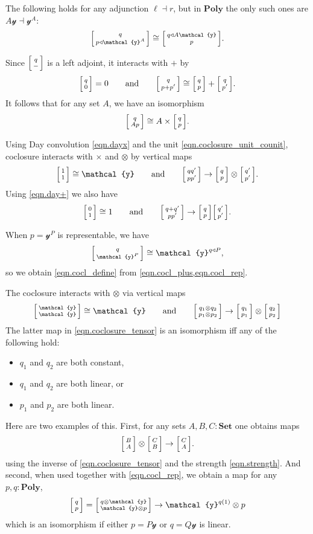 \documentclass[11pt, one side, article]{memoir}
\makeatletter
\theoremstyle{definition}
\theoremstyle{plain}
\newcommand{\Cat}[1]{\mathbf{#1}}%
\newcommand{\tn}[1]{\textnormal{#1}}
\newcommand{\smset}{\Cat{Set}}
\newcommand{\yon}{{\mathcal{y}}}
\newcommand{\poly}{\Cat{Poly}}
\newcommand{\0}{\textsf{0}}
\newcommand{\1}{\tn{\textsf{1}}}
\newcommand{\tri}{\mathbin{\triangleleft}}
\newcommand{\biglens}[2]{
     \begin{bmatrix}{\vphantom{f_f^f}#2} \\ {\vphantom{f_f^f}#1} \end{bmatrix}
}
\newcommand{\littlelens}[2]{
     \begin{bsmallmatrix}{\vphantom{f}#2} \\ {\vphantom{f}#1} \end{bsmallmatrix}
}
\newcommand{\lens}[2]{
  \relax\if@display
     \biglens{#1}{#2}
  \else
     \littlelens{#1}{#2}
  \fi
}
\newcommand{\hh}[2][]{#1 \tn{#2} #1}
\newcommand{\qqand}{\hh[\qquad]{and}}
\makeatother
\begin{document}
The following holds for any adjunction $\ell\dashv r$, but in $\poly$ the only such ones are $A\yon\dashv\yon^A$:
\begin{equation}
\lens{p\tri\yon^A}{q}\cong\lens{p}{q\tri A\yon}.
\end{equation}

Since $\lens{-}{q}$ is a left adjoint, it interacts with $+$ by
\begin{equation}\label{eqn.cocl_plus}
	\lens{0}{q}=0
	\qqand
	\lens{p+p'}{q}\cong\lens{p}{q}+\lens{p'}{q}.
\end{equation}
It follows that for any set $A$, we have an isomorphism
\begin{equation}\label{eqn.lens_Abase}
	\lens{Ap}{q}\cong A\times\lens{p}{q}.
\end{equation}


Using Day convolution \eqref{eqn.dayx} and the unit \eqref{eqn.coclosure_unit_counit}, coclosure interacts with $\times$ and $\otimes$ by vertical maps
\begin{equation}
 	\lens{1}{1}\cong\yon
	\qqand
  \lens{pp'}{qq'}\to\lens{p}{q}\otimes\lens{p'}{q'}.
\end{equation}
Using \eqref{eqn.day+} we also have
\begin{equation}
	\lens{1}{0}\cong 1
	\qqand
	\lens{pp'}{q+q'}\to\lens{p}{q}\lens{p'}{q'}.
\end{equation}

When $p=\yon^P$ is representable, we have
\begin{equation}\label{eqn.cocl_rep}
	\lens{\yon^P}{q}\cong\yon^{q\tri P},
\end{equation}
so we obtain \eqref{eqn.cocl_define} from \cref{eqn.cocl_plus,eqn.cocl_rep}. 

The coclosure interacts with $\otimes$ via vertical maps
\begin{equation}\label{eqn.coclosure_tensor}
	\lens{\yon}{\yon}\cong\yon
	\qqand
	\lens{p_1\otimes p_2}{q_1\otimes q_2}\to\lens{p_1}{q_1}\otimes\lens{p_2}{q_2}
\end{equation}
The latter map in \eqref{eqn.coclosure_tensor} is an isomorphism iff any of the following hold:
\begin{itemize}
	\item $q_1$ and $q_2$ are both constant,
	\item $q_1$ and $q_2$ are both linear, or
	\item $p_1$ and $p_2$ are both linear.
\end{itemize}
Here are two examples of this. First, for any sets $A,B,C:\smset$ one obtains maps
\begin{equation}
	\lens{A}{B}\otimes\lens{B}{C}\to\lens{A}{C}.
\end{equation}
using the inverse of \eqref{eqn.coclosure_tensor} and the strength \eqref{eqn.strength}. And second, when used together with \eqref{eqn.cocl_rep}, we obtain a map for any $p,q:\poly$,
\begin{equation}
	\lens{p}{q}=\lens{\yon\otimes p}{q\otimes\yon}\to\yon^{q(1)}\otimes p
\end{equation}
which is an isomorphism if either $p=P\yon$ or $q=Q\yon$ is linear.
\end{document}
